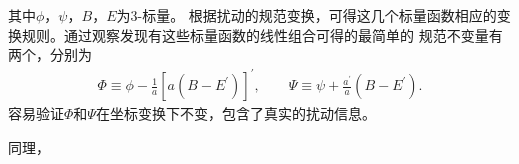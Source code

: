 其中$\phi$，$\psi$，$B$，$E$为3-标量。
根据扰动的规范变换，可得这几个标量函数相应的变换规则。通过观察发现有这些标量函数的线性组合可得的最简单的
规范不变量有两个，分别为
\begin{align}
  \label{eq:gauge-invariant-scalar}
  \Phi\equiv \phi -\frac{1}{a}{[a{\left(B-E^{\prime}\right)}]}^{\prime}
  ,\qquad
  \Psi \equiv \psi + \frac{a^{\prime}}{a}{\left(B-E^{\prime}\right)}.
\end{align}
容易验证$\Phi$和$\Psi$在坐标变换下不变，包含了真实的扰动信息。

同理，
